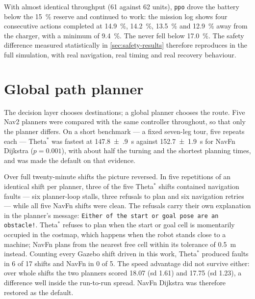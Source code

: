 With almost identical throughput (\num{61} against \num{62} units), \texttt{ppo} drove the battery
below the \SI{15}{\percent} reserve and continued to work: the mission log shows four consecutive
actions completed at \SI{14.9}{\percent}, \SI{14.2}{\percent}, \SI{13.5}{\percent} and
\SI{12.9}{\percent} away from the charger, with a minimum of \SI{9.4}{\percent}. The \NS never fell
below \SI{17.0}{\percent}. The safety difference measured statistically in
\cref{sec:safety-results} therefore reproduces in the full simulation, with real navigation,
real timing and real recovery behaviour.

\section{Global path planner}
\label{sec:planner-study}

The decision layer chooses destinations; a global planner chooses the route. Five Nav2 planners
were compared with the same controller throughout, so that only the planner differs. On a short
benchmark --- a fixed seven-leg tour, five repeats each --- Theta$^{*}$ was fastest at
\SI{147.8(9)}{\second} against \SI{152.7(19)}{\second} for NavFn Dijkstra ($p=0.001$), with about
half the turning and the shortest planning times, and was made the default on that evidence.

Over full twenty-minute shifts the picture reversed. In five repetitions of an identical shift per
planner, three of the five Theta$^{*}$ shifts contained navigation faults --- six planner-loop
stalls, three refusals to plan and six navigation retries --- while all five NavFn shifts were
clean. The refusals carry their own explanation in the planner's message: \texttt{Either of the
start or goal pose are an obstacle!}. Theta$^{*}$ refuses to plan when the start or goal cell is
momentarily occupied in the costmap, which happens when the robot stands close to a machine;
NavFn plans from the nearest free cell within its tolerance of \SI{0.5}{\metre} instead. Counting
every Gazebo shift driven in this work, Theta$^{*}$ produced faults in \num{6} of \num{17} shifts
and NavFn in \num{0} of \num{5}. The speed advantage did not survive either: over whole shifts the
two planners scored \num{18.07} (sd \num{1.61}) and \num{17.75} (sd \num{1.23}), a difference well
inside the run-to-run spread. NavFn Dijkstra was therefore restored as the default.
